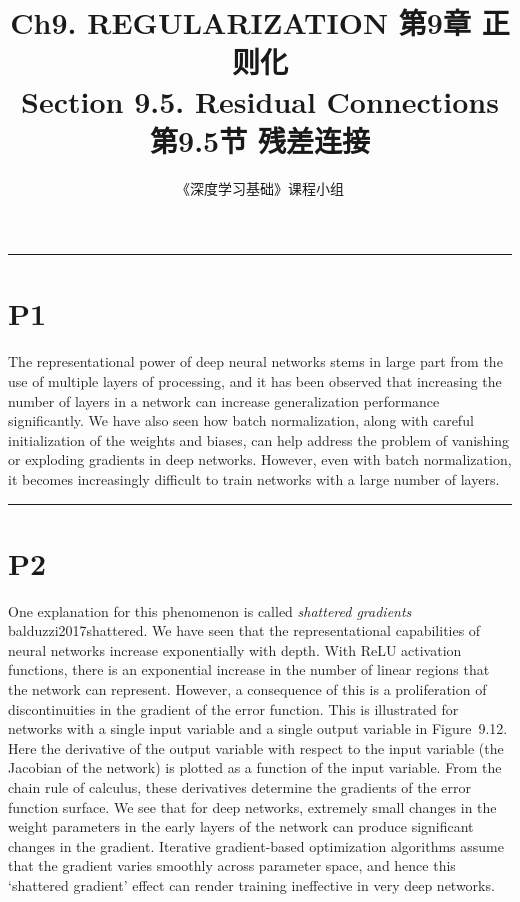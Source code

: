\documentclass{article}
\title{Ch9. REGULARIZATION \hfill 第9章 正则化 \\ 
Section 9.5. Residual Connections \hfill 第9.5节 残差连接}
\author{《深度学习基础》课程小组}
\begin{document}
\maketitle

\setlength{\parindent}{0pt} %
\setlength{\parskip}{1.5em} %

\noindent\rule{\linewidth}{0.4pt}

\section{P1}

The representational power of deep neural networks stems in large part from the use of multiple layers of processing, and it has been observed that increasing the number of layers in a network can increase generalization performance significantly. We have also seen how batch normalization, along with careful initialization of the weights and biases, can help address the problem of vanishing or exploding gradients in deep networks. However, even with batch normalization, it becomes increasingly difficult to train networks with a large number of layers.

\noindent\rule{\linewidth}{0.4pt}

\section{P2}

One explanation for this phenomenon is called \emph{shattered gradients} {balduzzi2017shattered}. We have seen that the representational capabilities of neural networks increase exponentially with depth. With ReLU activation functions, there is an exponential increase in the number of linear regions that the network can represent. However, a consequence of this is a proliferation of discontinuities in the gradient of the error function. This is illustrated for networks with a single input variable and a single output variable in Figure~9.12. Here the derivative of the output variable with respect to the input variable (the Jacobian of the network) is plotted as a function of the input variable. From the chain rule of calculus, these derivatives determine the gradients of the error function surface. We see that for deep networks, extremely small changes in the weight parameters in the early layers of the network can produce significant changes in the gradient. Iterative gradient-based optimization algorithms assume that the gradient varies smoothly across parameter space, and hence this `shattered gradient' effect can render training ineffective in very deep networks.
\end{document}
